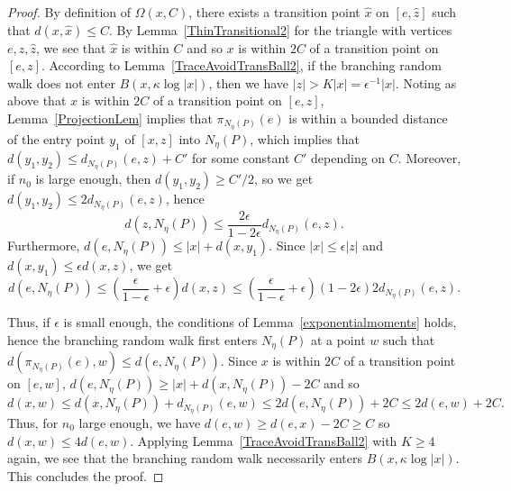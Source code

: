 \documentclass{amsart}
\newcommand{\showcomments}{yes}
\newenvironment{comment}%
{\ifthenelse{\equal{\showcomments}{yes}}%
{\footnotemark
    \begin{lrbox}{\commentbox}
    \begin{minipage}[t]{1.25in}\raggedright\sffamily\upshape\tiny
    \footnotemark[\arabic{footnote}]}%
{\begin{lrbox}{\commentbox}}}%
{\ifthenelse{\equal{\showcomments}{yes}}%
{\end{minipage}\end{lrbox}\marginpar{\usebox{\commentbox}}}%
{\end{lrbox}}}
\theoremstyle{definition}
\theoremstyle{remark}
\newcommand{\ywy}[1]{{\color{red}{#1}}}
\begin{document}
\begin{proof}
By definition of $\Omega(x,C)$, there exists a transition point $\hat{x}$ on $[e,\hat{z}]$ such that $d(x,\hat x)\le C$.
By Lemma~\ref{ThinTransitional2} for the triangle with vertices $e,z,\hat{z}$, we see that $\hat{x}$ is within $C$ and so $x$ is within $2C$ of a transition point on $[e,z]$.
According to Lemma~\ref{TraceAvoidTransBall2}, if the branching random walk does not enter $B(x, \kappa\log |x|)$, then we have $ |z|> K |x|=\epsilon^{-1}|x|$.
Noting as above that $x$ is within $2C$ of a transition point on $[e,z]$,     Lemma~\ref{ProjectionLem} implies that $\pi_{N_\eta(P)}(e)$ is within a bounded   distance   of the entry point $y_1$ of $[x,z]$ into $N_\eta(P)$,  which implies that
$d(y_1,y_2) \leq d_{N_\eta(P)}(e,z)+C'$ for some constant $C'$ depending on $C$.
Moreover, if $n_0$ is large enough, then $d(y_1,y_2)\geq C'/2$, so we get
$d(y_1,y_2)\leq 2d_{N_\eta(P)}(e,z)$, hence
$$d(z,N_\eta(P))\leq \frac{2\epsilon}{1-2\epsilon}d_{N_\eta(P)}(e,z).$$
Furthermore, $d(e,N_\eta(P))\leq |x|+d(x,y_1)$.
Since $|x|\leq \epsilon|z|$ and $d(x,y_1)\leq \epsilon d(x,z)$, we get
$$d(e,N_\eta(P))\leq \left (\frac{\epsilon}{1-\epsilon}+\epsilon\right )d(x,z)\leq \left (\frac{\epsilon}{1-\epsilon}+\epsilon\right )(1-2\epsilon)2d_{N_\eta(P)}(e,z).$$

Thus, if $\epsilon$ is small enough, the conditions of Lemma~\ref{exponentialmoments} holds, hence the branching random walk first enters $N_\eta(P)$ at a point $w$ such that $d(\pi_{N_\eta(P)}(e),w)\leq d(e,N_\eta(P))$.
%
Since $x$ is within $2C$ of a transition point on $[e,w]$, $d(e,N_\eta(P))\geq |x|+d(x,N_\eta(P))-2C$
and so
$$d(x,w)\leq d(x, N_\eta(P))+d_{N_\eta(P)}(e,w)\leq 2 d(e, {N_\eta(P)})   +2C\leq 2d(e,w)+2C.$$Thus, for $n_0$ large enough, we have $d(e,w)\ge d(e,x)-2C\ge  C$ so $d(x,w)\le 4d(e,w)$. Applying   Lemma~\ref{TraceAvoidTransBall2} with $K\ge 4$ again, we see that the branching random walk necessarily enters $B(x,\kappa \log |x|)$.
This concludes the proof.
\end{proof}  
    
\end{document}
